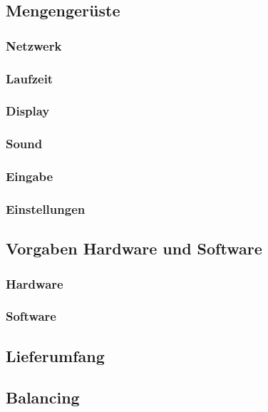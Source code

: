 \subsection{Mengengerüste}
    \subsubsection{Netzwerk}
    
    \subsubsection{Laufzeit}
    
    \subsubsection{Display}
    
    \subsubsection{Sound}
    
    \subsubsection{Eingabe}
    
    \subsubsection{Einstellungen}
    
\clearpage
\subsection{Vorgaben Hardware und Software}
    \subsubsection{Hardware}
    
    \subsubsection{Software}\label{subsubsec:softwareMinReq}
    

\subsection{Lieferumfang}\label{subsec:lieferumfang}

\clearpage

\subsection{Balancing}\label{subsec:balancing}
